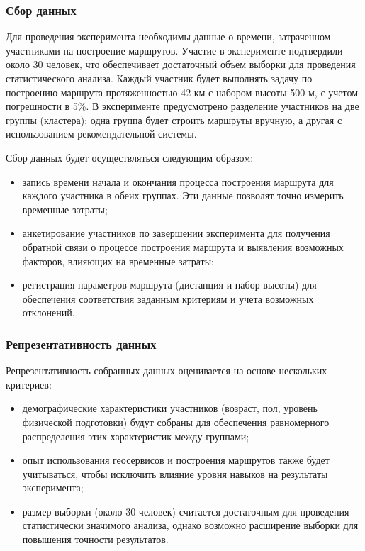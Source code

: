 \subsubsection{Сбор данных}
Для проведения эксперимента необходимы данные о времени, затраченном участниками на построение маршрутов. Участие в эксперименте подтвердили около 30 человек, что обеспечивает достаточный объем выборки для проведения статистического анализа. Каждый участник будет выполнять задачу по построению маршрута протяженностью 42 км с набором высоты 500 м, с учетом погрешности в 5\%. В эксперименте предусмотрено разделение участников на две группы (кластера): одна группа будет строить маршруты вручную, а другая с использованием рекомендательной системы.

Сбор данных будет осуществляться следующим образом:

\begin{itemize}
\item запись времени начала и окончания процесса построения маршрута для каждого участника в обеих группах. Эти данные позволят точно измерить временные затраты;
\item анкетирование участников по завершении эксперимента для получения обратной связи о процессе построения маршрута и выявления возможных факторов, влияющих на временные затраты;
\item регистрация параметров маршрута (дистанция и набор высоты) для обеспечения соответствия заданным критериям и учета возможных отклонений.
\end{itemize}

\subsubsection{Репрезентативность данных}

Репрезентативность собранных данных оценивается на основе нескольких критериев:

\begin{itemize}
\item демографические характеристики участников (возраст, пол, уровень физической подготовки) будут собраны для обеспечения равномерного распределения этих характеристик между группами;
\item опыт использования геосервисов и построения маршрутов также будет учитываться, чтобы исключить влияние уровня навыков на результаты эксперимента;
\item размер выборки (около 30 человек) считается достаточным для проведения статистически значимого анализа, однако возможно расширение выборки для повышения точности результатов.
\end{itemize}

